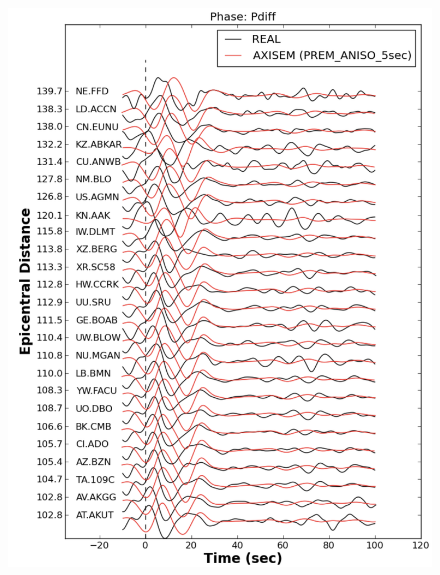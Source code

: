 \documentclass{article}
\begin{document}
\begin{figure}
\centering
\begin{minipage}{.5\textwidth}
  \centering
  \includegraphics[width=1.\linewidth]{AXISEMTutorial-fig008.pdf}
\end{minipage}%
\begin{minipage}{.5\textwidth}
  \centering

\end{minipage}
\end{figure}
\end{document}
